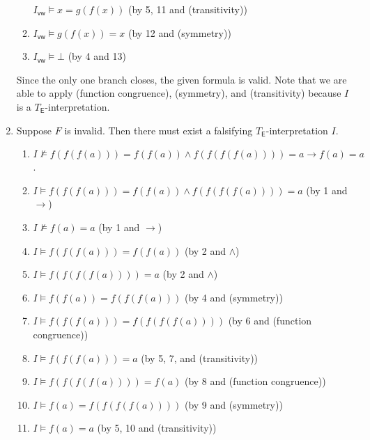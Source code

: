 \begin{exer}[3.1]
\begin{enumerate}[label=(\alph*)]
\begin{enumerate}[label=\arabic*.]
                    $I_{\textsf{vw}} \models x = g(f(x))$ (by 5, 11 and \textsf{(transitivity)})
                \item %
                    $I_{\textsf{vw}} \models g(f(x)) = x$ (by 12 and \textsf{(symmetry)})
                \item %
                    $I_{\textsf{vw}} \models \bot$ (by 4 and 13)
            \end{enumerate}
            Since the only one branch closes, the given formula is valid.
            Note that we are able to apply \textsf{(function congruence)}, \textsf{(symmetry)}, and \textsf{(transitivity)} because $I$ is a $T_{\textsf{E}}$-interpretation.
        \item
            Suppose $F$ is invalid.
            Then there must exist a falsifying $T_{\textsf{E}}$-interpretation $I$.
            \begin{enumerate}[label=\arabic*.]
                \item %
                    $I \not\models f(f(f(a))) = f(f(a)) \land f(f(f(f(a)))) = a \rightarrow f(a) = a$.
                \item %
                    $I \models f(f(f(a))) = f(f(a)) \land f(f(f(f(a)))) = a$ (by 1 and $\rightarrow$)
                \item %
                    $I \not\models f(a) = a$ (by 1 and $\rightarrow$)
                \item %
                    $I \models f(f(f(a))) = f(f(a))$ (by 2 and $\land$)
                \item %
                    $I \models f(f(f(f(a)))) = a$ (by 2 and $\land$)
                \item %
                    $I \models f(f(a)) = f(f(f(a)))$ (by 4 and \textsf{(symmetry)})
                \item %
                    $I \models f(f(f(a))) = f(f(f(f(a))))$ (by 6 and \textsf{(function congruence)})
                \item %
                    $I \models f(f(f(a))) = a$ (by 5, 7, and \textsf{(transitivity)})
                \item %
                    $I \models f(f(f(f(a)))) = f(a)$ (by 8 and \textsf{(function congruence)})
                \item %
                    $I \models f(a) = f(f(f(f(a))))$ (by 9 and \textsf{(symmetry)})
                \item %
                    $I \models f(a) = a$ (by 5, 10 and \textsf{(transitivity)})

\end{enumerate}
\end{enumerate}
\end{exer}
